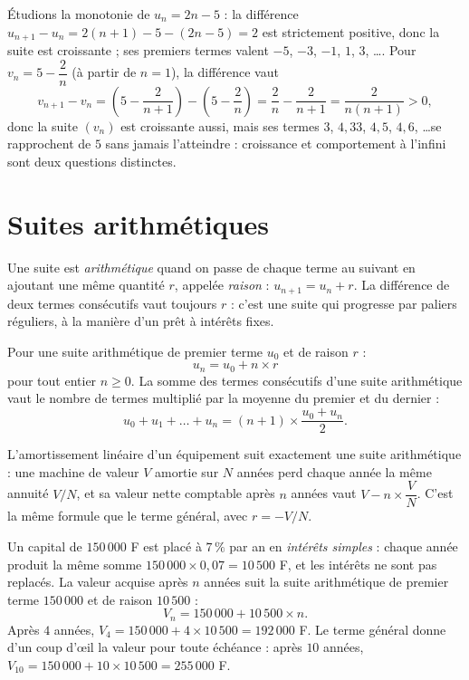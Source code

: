 \begin{exemple}
Étudions la monotonie de $u_{n} = 2n - 5$ : la différence $u_{n+1} - u_{n} = 2(n+1) - 5 - (2n - 5) = 2$ est strictement positive, donc la suite est croissante ; ses premiers termes valent $-5$, $-3$, $-1$, $1$, $3$, \dots. Pour $v_{n} = 5 - \dfrac{2}{n}$ (à partir de $n = 1$), la différence vaut
\[
v_{n+1} - v_{n} = \left(5 - \frac{2}{n+1}\right) - \left(5 - \frac{2}{n}\right)
= \frac{2}{n} - \frac{2}{n+1} = \frac{2}{n(n+1)} > 0,
\]
donc la suite $(v_{n})$ est croissante aussi, mais ses termes $3$, $4{,}33$, $4{,}5$, $4{,}6$, \dots se rapprochent de $5$ sans jamais l'atteindre : croissance et comportement à l'infini sont deux questions distinctes.
\end{exemple}

\section{Suites arithmétiques}

\begin{definition}
Une suite est \emph{arithmétique} quand on passe de chaque terme au suivant en ajoutant une même quantité $r$, appelée \emph{raison} : $u_{n+1} = u_{n} + r$. La différence de deux termes consécutifs vaut toujours $r$ : c'est une suite qui progresse par paliers réguliers, à la manière d'un prêt à intérêts fixes.
\end{definition}

\begin{propriete}
Pour une suite arithmétique de premier terme $u_{0}$ et de raison $r$ :
\[
u_{n} = u_{0} + n \times r
\]
pour tout entier $n \geqslant 0$. La somme des termes consécutifs d'une suite arithmétique vaut le nombre de termes multiplié par la moyenne du premier et du dernier :
\[
u_{0} + u_{1} + \dots + u_{n} = (n + 1) \times \frac{u_{0} + u_{n}}{2} .
\]
\end{propriete}

\begin{remarque}
L'amortissement linéaire d'un équipement suit exactement une suite arithmétique : une machine de valeur $V$ amortie sur $N$ années perd chaque année la même annuité $V/N$, et sa valeur nette comptable après $n$ années vaut $V - n \times \dfrac{V}{N}$. C'est la même formule que le terme général, avec $r = -V/N$.
\end{remarque}

\begin{exemple}
Un capital de $150\,000$ F est placé à $7\,\%$ par an en \emph{intérêts simples} : chaque année produit la même somme $150\,000 \times 0{,}07 = 10\,500$ F, et les intérêts ne sont pas replacés. La valeur acquise après $n$ années suit la suite arithmétique de premier terme $150\,000$ et de raison $10\,500$ :
\[
V_{n} = 150\,000 + 10\,500 \times n .
\]
Après $4$ années, $V_{4} = 150\,000 + 4 \times 10\,500 = 192\,000$ F. Le terme général donne d'un coup d'œil la valeur pour toute échéance : après $10$ années, $V_{10} = 150\,000 + 10 \times 10\,500 = 255\,000$ F.
\end{exemple}

